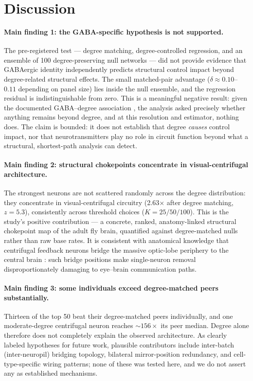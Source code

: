 \section{Discussion}

\paragraph{Main finding 1: the GABA-specific hypothesis is not supported.}
The pre-registered test --- degree matching, degree-controlled regression,
and an ensemble of 100 degree-preserving null networks --- did not provide
evidence that GABAergic identity independently predicts structural control
impact beyond degree-related structural effects. The small matched-pair
advantage ($\delta\approx0.10$--$0.11$ depending on panel size) lies
inside the null ensemble, and the regression residual is indistinguishable
from zero. This is a meaningful negative result: given the documented
GABA--degree association \cite{lin2024}, the analysis asked precisely
whether anything remains beyond degree, and at this resolution and
estimator, nothing does. The claim is bounded: it does not establish that
degree \emph{causes} control impact, nor that neurotransmitters play no
role in circuit function beyond what a structural, shortest-path analysis
can detect.

\paragraph{Main finding 2: structural chokepoints concentrate in
visual-centrifugal architecture.}
The strongest neurons are not scattered randomly across the degree
distribution: they concentrate in visual-centrifugal circuitry
(2.63$\times$ after degree matching, $z=5.3$), consistently across
threshold choices ($K=25/50/100$). This is the study's positive
contribution --- a concrete, ranked, anatomy-linked structural chokepoint
map of the adult fly brain, quantified against degree-matched nulls rather
than raw base rates. It is consistent with anatomical knowledge that
centrifugal feedback neurons bridge the massive optic-lobe periphery to
the central brain \cite{matsliah2024,hoeller2026,mickels2026}: such bridge
positions make single-neuron removal disproportionately damaging to
eye--brain communication paths.

\paragraph{Main finding 3: some individuals exceed degree-matched peers
substantially.}
Thirteen of the top 50 beat their degree-matched peers individually, and
one moderate-degree centrifugal neuron reaches ${\sim}156\times$ its peer
median. Degree alone therefore does not completely explain the observed
architecture. As clearly labeled hypotheses for future work, plausible
contributors include inter-batch (inter-neuropil) bridging topology,
bilateral mirror-position redundancy, and cell-type-specific wiring
patterns; none of these was tested here, and we do not assert any as
established mechanisms.

